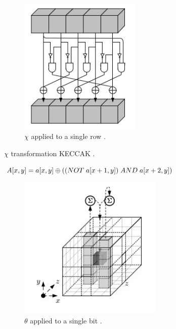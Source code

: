   \begin{figure}
    \begin{center}
      \includegraphics[width=2.3in]{keccakchi.jpg}
    \end{center}
    \caption{$\chi$ applied to a single row \cite{00015}.}
    \label{fig:lab}
  \end{figure}

  \begin{algorithm}
    \caption{ $\chi$ transformation KECCAK \cite{00015}.}
    \begin{algorithmic}[1]
      \State {}
      \State {}
      $A[x, y] = a[x, y] \oplus ((NOT \thickspace a[x + 1, y]) \thickspace AND \thickspace a[x + 2, y])$
      \State \EndFor
      \State \EndFor
    \end{algorithmic}
  \end{algorithm}
  
  \begin{figure}
    \begin{center}
      \includegraphics[width=2.7in]{keccaktheta.jpg}
    \end{center}
    \caption{$\theta$ applied to a single bit \cite{00015}.}
    \label{fig:lab}
  \end{figure}

